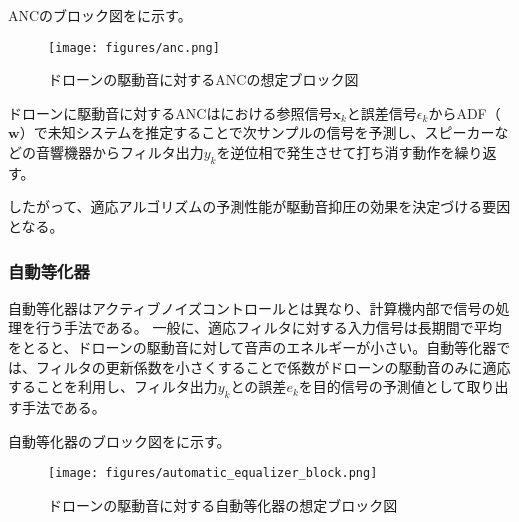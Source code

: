 ANCのブロック図をに示す。

\begin{figure}[H]
\centering
\texttt{[image: figures/anc.png]}
\caption{ドローンの駆動音に対するANCの想定ブロック図}
\label{fig:anc_block}
\end{figure}

ドローンに駆動音に対するANCはにおける参照信号\(\bm{x}_k\)と誤差信号\(\epsilon_k\)からADF（\(\bm{w}\)）で未知システムを推定することで次サンプルの信号を予測し、スピーカーなどの音響機器からフィルタ出力\(y_k\)を逆位相で発生させて打ち消す動作を繰り返す。

したがって、適応アルゴリズムの予測性能が駆動音抑圧の効果を決定づける要因となる。

\subsubsection{自動等化器}\label{automatic-equalizer}

自動等化器はアクティブノイズコントロールとは異なり、計算機内部で信号の処理を行う手法である。
一般に、適応フィルタに対する入力信号は長期間で平均をとると、ドローンの駆動音に対して音声のエネルギーが小さい。自動等化器では、フィルタの更新係数を小さくすることで係数がドローンの駆動音のみに適応することを利用し、フィルタ出力\(y_k\)との誤差\(e_k\)を目的信号の予測値として取り出す手法である。

自動等化器のブロック図をに示す。

\begin{figure}[H]
\centering
\texttt{[image: figures/automatic\_equalizer\_block.png]}
\caption{ドローンの駆動音に対する自動等化器の想定ブロック図}
\label{equ:automatic_equlizer_block}
\end{figure}
